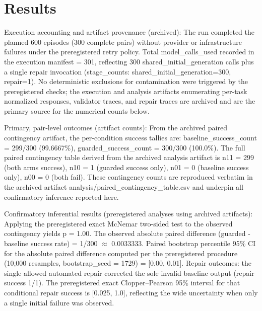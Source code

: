 \documentclass[conference]{IEEEtran}
\begin{document}
\section{Results}
Execution accounting and artifact provenance (archived): The run completed the planned 600 episodes (300 complete pairs) without provider or infrastructure failures under the preregistered retry policy. Total model\_calls\_used recorded in the execution manifest = 301, reflecting 300 shared\_initial\_generation calls plus a single repair invocation (stage\_counts: shared\_initial\_generation=300, repair=1). No deterministic exclusions for contamination were triggered by the preregistered checks; the execution and analysis artifacts enumerating per‑task normalized responses, validator traces, and repair traces are archived and are the primary source for the numerical counts below.

Primary, pair‑level outcomes (artifact counts): From the archived paired contingency artifact, the per‑condition success tallies are: baseline\_success\_count = 299/300 (99.6667\%), guarded\_success\_count = 300/300 (100.0\%). The full paired contingency table derived from the archived analysis artifact is n11 = 299 (both arms success), n10 = 1 (guarded success only), n01 = 0 (baseline success only), n00 = 0 (both fail). These contingency counts are reproduced verbatim in the archived artifact analysis/paired\_contingency\_table.csv and underpin all confirmatory inference reported here.

Confirmatory inferential results (preregistered analyses using archived artifacts): Applying the preregistered exact McNemar two‑sided test to the observed contingency yields p = 1.00. The observed absolute paired difference (guarded - baseline success rate) = 1/300 \ensuremath{\approx} 0.0033333. Paired bootstrap percentile 95\% CI for the absolute paired difference computed per the preregistered procedure (10,000 resamples, bootstrap\_seed = 1729) = [0.00, 0.01]. Repair outcomes: the single allowed automated repair corrected the sole invalid baseline output (repair success 1/1). The preregistered exact Clopper--Pearson 95\% interval for that conditional repair success is [0.025, 1.0], reflecting the wide uncertainty when only a single initial failure was observed.
\end{document}
